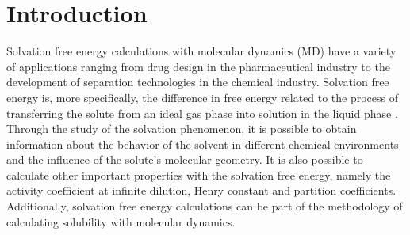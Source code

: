 \chapter{Introduction} %
\label{Chapter1} %
\pagestyle{simple}
\doublespacing
Solvation free energy calculations with molecular dynamics (MD) have a variety of applications ranging from drug design in the pharmaceutical industry to the development of separation technologies in the chemical industry. {Solvation free energy is, more specifically, the difference in free energy related to the process of transferring the solute from an ideal gas phase into solution in the liquid phase \cite{shirts2013}}. Through the study of the solvation phenomenon, it is possible to obtain information about the behavior of the solvent in different chemical environments and the influence of the solute's molecular geometry. It is also possible to calculate other important properties with the solvation free energy, namely the activity coefficient at infinite dilution, Henry constant and partition coefficients.{ Additionally, solvation free energy calculations can be part of the methodology of calculating solubility with molecular dynamics}. 

